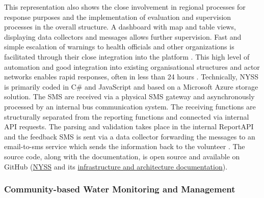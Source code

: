 
This representation also shows the close involvement in regional processes for response purposes and the implementation of evaluation and supervision processes in the overall structure. A dashboard with map and table views, displaying data collectors and messages allows further supervision. Fast and simple escalation of warnings to health officials and other organizations is facilitated through their close integration into the platform \autocite{nrcNYSSCommunitybasedSurveillance2021,nrcWhatNyss2023}. This high level of automation and good integration into existing organisational structures and actor networks enables rapid responses, often in less than 24 hours \autocite{jungCommunityBasedSurveillance2022}.\newline
Technically, NYSS is primarily coded in C# and JavaScript and based on a Microsoft Azure storage solution. The SMS are received via a physical SMS gateway and asynchronously processed by an internal bus communication system. The receiving functions are structurally separated from the reporting functions and connected via internal API requests. The parsing and validation takes place in the internal ReportAPI and the feedback SMS is sent via a data collector forwarding the messages to an email-to-sms service which sends the information back to the volunteer \autocite{nrcNyssToolDeveloped2023,nrcNYSSCommunitybasedSurveillance2021,nrcWhatNyss2023}. The source code, along with the documentation, is open source and available on GitHub (\href{https://github.com/nyss-platform-norcross/nyss}{NYSS} and its \href{https://github.com/nyss-platform-norcross/nyss/tree/master/Infrastructure}{infrastructure and architecture documentation}).

\subsubsection*{Community-based Water Monitoring and Management}\label{subsubsec:cbwm}

